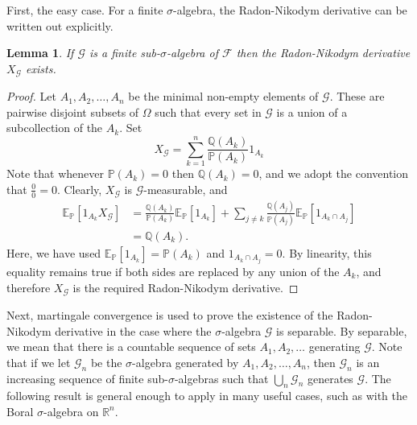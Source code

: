 \documentclass[12pt]{article}
\newtheorem{lemma}{Lemma}
\begin{document}
First, the easy case. For a finite $\sigma$-algebra, the Radon-Nikodym derivative can be written out explicitly.

\begin{lemma}
If $\mathcal{G}$ is a finite sub-$\sigma$-algebra of $\mathcal{F}$ then the Radon-Nikodym derivative $X_\mathcal{G}$ exists.
\end{lemma}
\begin{proof}
Let $A_1,A_2,\ldots,A_n$ be the minimal non-empty elements of $\mathcal{G}$. These are pairwise disjoint subsets of $\Omega$ such that every set in $\mathcal{G}$ is a union of a subcollection of the $A_k$. Set
\begin{equation*}
X_\mathcal{G}=\sum_{k=1}^n \frac{\mathbb{Q}(A_k)}{\mathbb{P}(A_k)}1_{A_k}
\end{equation*}
Note that whenever $\mathbb{P}(A_k)=0$ then $\mathbb{Q}(A_k)=0$, and we adopt the convention that $\frac{0}{0}=0$. Clearly, $X_\mathcal{G}$ is $\mathcal{G}$-measurable, and
\begin{equation*}\begin{split}
\mathbb{E}_{\mathbb{P}}[1_{A_k}X_\mathcal{G}]
&=\frac{\mathbb{Q}(A_k)}{\mathbb{P}(A_k)}\mathbb{E}_{\mathbb{P}}[1_{A_k}]+\sum_{j\not=k}\frac{\mathbb{Q}(A_j)}{\mathbb{P}(A_j)}\mathbb{E}_{\mathbb{P}}[1_{A_k\cap A_j}]\\
&=\mathbb{Q}(A_k).
\end{split}\end{equation*}
Here, we have used $\mathbb{E}_{\mathbb{P}}[1_{A_k}]=\mathbb{P}(A_k)$ and $1_{A_k\cap A_j}=0$. By linearity, this equality remains true if both sides are replaced by any union of the $A_k$, and therefore $X_\mathcal{G}$ is the required Radon-Nikodym derivative.
\end{proof}

Next, martingale convergence is used to prove the existence of the Radon-Nikodym derivative in the case where the $\sigma$-algebra $\mathcal{G}$ is separable. By separable, we mean that there is a countable sequence of sets $A_1,A_2,\ldots$ generating $\mathcal{G}$. Note that if we let $\mathcal{G}_n$ be the $\sigma$-algebra generated by $A_1,A_2,\ldots,A_n$, then $\mathcal{G}_n$ is an increasing sequence of finite sub-$\sigma$-algebras such that $\bigcup_n\mathcal{G}_n$ generates $\mathcal{G}$. The following result is general enough to apply in many useful cases, such as with the Boral $\sigma$-algebra on $\mathbb{R}^n$.
\end{document}
